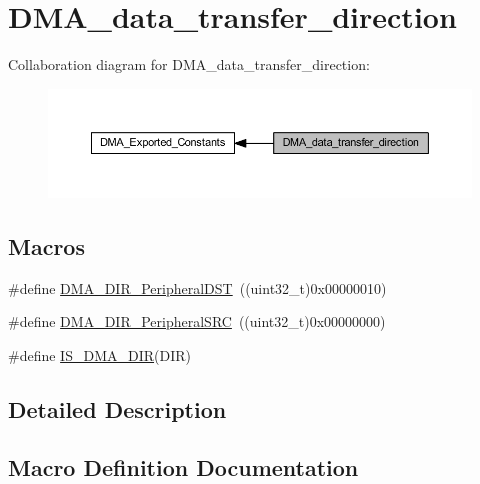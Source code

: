 \hypertarget{group___d_m_a__data__transfer__direction}{}\section{D\+M\+A\+\_\+data\+\_\+transfer\+\_\+direction}
\label{group___d_m_a__data__transfer__direction}
Collaboration diagram for D\+M\+A\+\_\+data\+\_\+transfer\+\_\+direction\+:
\nopagebreak
\begin{figure}[H]
\begin{center}
\leavevmode
\includegraphics[width=350pt]{group___d_m_a__data__transfer__direction}
\end{center}
\end{figure}
\subsection*{Macros}
\begin{DoxyCompactItemize}
\item 
\#define \hyperlink{group___d_m_a__data__transfer__direction_ga51567b748ddac277743c65c20275971a}{D\+M\+A\+\_\+\+D\+I\+R\+\_\+\+Peripheral\+D\+ST}~((uint32\+\_\+t)0x00000010)
\item 
\#define \hyperlink{group___d_m_a__data__transfer__direction_ga5ce120a044359410136695a2c05df68e}{D\+M\+A\+\_\+\+D\+I\+R\+\_\+\+Peripheral\+S\+RC}~((uint32\+\_\+t)0x00000000)
\item 
\#define \hyperlink{group___d_m_a__data__transfer__direction_gaaad13d2b5808e32a35a2d21bcdbb2296}{I\+S\+\_\+\+D\+M\+A\+\_\+\+D\+IR}(D\+IR)
\end{DoxyCompactItemize}


\subsection{Detailed Description}


\subsection{Macro Definition Documentation}
\mbox{\label{group___d_m_a__data__transfer__direction_ga51567b748ddac277743c65c20275971a}} 
